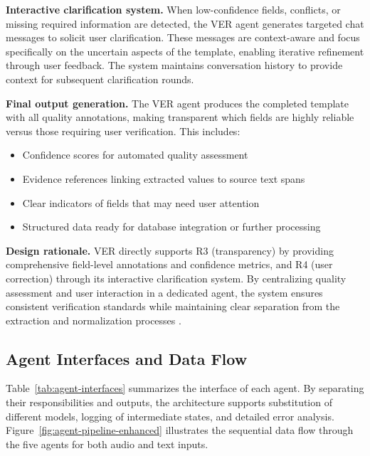 \textbf{Interactive clarification system.} When low-confidence fields, conflicts, or missing required information are detected, the VER agent generates targeted chat messages to solicit user clarification. These messages are context-aware and focus specifically on the uncertain aspects of the template, enabling iterative refinement through user feedback. The system maintains conversation history to provide context for subsequent clarification rounds.

\textbf{Final output generation.} The VER agent produces the completed template with all quality annotations, making transparent which fields are highly reliable versus those requiring user verification. This includes:
\begin{itemize}
    \item Confidence scores for automated quality assessment
    \item Evidence references linking extracted values to source text spans
    \item Clear indicators of fields that may need user attention
    \item Structured data ready for database integration or further processing
\end{itemize}

\textbf{Design rationale.} VER directly supports R3 (transparency) by providing comprehensive field-level annotations and confidence metrics, and R4 (user correction) through its interactive clarification system. By centralizing quality assessment and user interaction in a dedicated agent, the system ensures consistent verification standards while maintaining clear separation from the extraction and normalization processes \cite{park2023generative}.

\subsection{Agent Interfaces and Data Flow}
\label{subsec:agent-interfaces}

Table~\ref{tab:agent-interfaces} summarizes the interface of each agent. By separating their responsibilities and outputs, the architecture supports substitution of different models, logging of intermediate states, and detailed error analysis. Figure~\ref{fig:agent-pipeline-enhanced} illustrates the sequential data flow through the five agents for both audio and text inputs.

